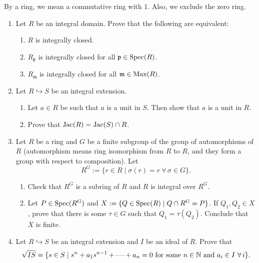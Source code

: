 \begin{convention}
By a ring, we mean a commutative ring with $1$. Also, we exclude the zero ring.
\end{convention}

\begin{enumerate}[label=\arabic*.]

\item Let $R$ be an integral domain. Prove that the following are equivalent:
\begin{enumerate}[label=(\alph*)]
    \item $R$ is integrally closed.
    \item $R_{\mathfrak p}$ is integrally closed for all $\mathfrak p \in \operatorname{Spec}(R)$.
    \item $R_{\mathfrak m}$ is integrally closed for all $\mathfrak m \in \operatorname{Max}(R)$.
\end{enumerate}

\item Let $R \hookrightarrow S$ be an integral extension.
\begin{enumerate}[label=(\alph*)]
    \item Let $a \in R$ be such that $a$ is a unit in $S$. Then show that $a$ is a unit in $R$.
    \item Prove that $\operatorname{Jac}(R) = \operatorname{Jac}(S) \cap R$.
\end{enumerate}

\item Let $R$ be a ring and $G$ be a finite subgroup of the group of automorphisms of $R$ (automorphism means ring isomorphism from $R$ to $R$, and they form a group with respect to composition). Let
\[
R^G := \{ r \in R \mid \sigma(r) = r\ \forall\, \sigma \in G \}.
\]
\begin{enumerate}[label=(\alph*)]
    \item Check that $R^G$ is a subring of $R$ and $R$ is integral over $R^G$.
    \item Let $P \in \operatorname{Spec}(R^G)$ and $X := \{Q \in \operatorname{Spec}(R) \mid Q \cap R^G = P\}$. If $Q_1,Q_2 \in X$, prove that there is some $\tau \in G$ such that $Q_1 = \tau(Q_2)$. Conclude that $X$ is finite.
\end{enumerate}

\item Let $R \hookrightarrow S$ be an integral extension and $I$ be an ideal of $R$. Prove that
\[
\sqrt{IS} = \{ s \in S \mid s^n + a_1s^{n-1} + \cdots + a_n = 0 \text{ for some } n \in \mathbb{N} \text{ and } a_i \in I\ \forall\, i \}.
\]


\end{enumerate}
